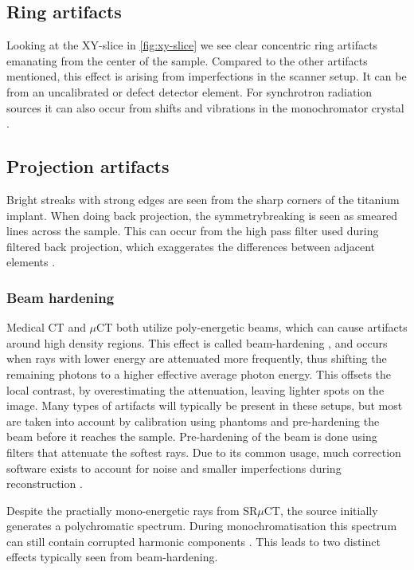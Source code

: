\subsection{Ring artifacts}

Looking at the XY-slice in \cref{fig:xy-slice} we see clear concentric ring artifacts emanating from
the center of the sample. Compared to the other artifacts mentioned, this effect is arising from
imperfections in the scanner setup. It can be from an uncalibrated or defect detector element. For
synchrotron radiation sources it can also occur from shifts and vibrations in the monochromator
crystal \citep{ringartifacts}.

\subsection{Projection artifacts}

Bright streaks with strong edges are seen from the sharp corners of the titanium implant. When
doing back projection, the symmetrybreaking is seen as smeared lines across the sample. This
can occur from the high pass filter used during filtered back projection, which exaggerates the
differences between adjacent elements \citep{ctnoise}.

\subsubsection{Beam hardening}

Medical CT and $\mu$CT both utilize poly-energetic beams, which can cause artifacts around high
density regions. This effect is called beam-hardening , and occurs when rays with
lower energy are attenuated more frequently, thus shifting the remaining photons to a higher
effective average photon energy. This offsets the local contrast, by overestimating
the attenuation, leaving lighter spots on the image. Many types of artifacts will typically be
present in these setups, but most are taken into account by calibration using phantoms and
pre-hardening the beam before it reaches the sample. Pre-hardening of the beam is done using
filters that attenuate the softest rays. Due to its common usage, much correction software exists
to account for noise and smaller imperfections during reconstruction .

Despite the practially mono-energetic rays from SR$\mu$CT, the source initially generates a
polychromatic spectrum. During monochromatisation this spectrum can still contain corrupted harmonic
components \citep{srnoise}. This leads to two distinct effects typically seen from beam-hardening.

